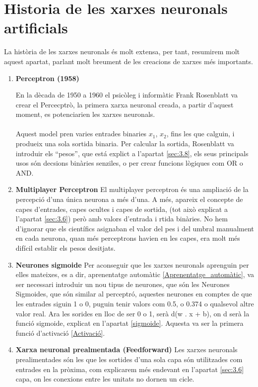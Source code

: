 \section{Historia de les xarxes neuronals artificials}
La història de les xarxes neuronals és molt extensa, per tant, resumirem molt aquest apartat, parlant molt breument de les creacions de xarxes més importants.
\begin{enumerate}
    \item \textbf{Perceptron (1958)}

    En la dècada de 1950 a 1960 el psicòleg i informàtic Frank Rosenblatt va crear el Percecptrò, la primera xarxa neuronal creada, a partir d'aquest moment, es potenciarien les xarxes neuronals.\\ \\
    Aquest model pren varies entrades binaries $x_1$, $x_2$, fins les que calguin, i produeix una sola sortida binaria. Per calcular la sortida, Rosenblatt va introduir els ``pesos'', que está explict a l'apartat \ref{sec:3.8}, els seus principals usos són decsions binàries senziles, o per crear funcions lògiques com OR o AND.

    \item \textbf{Multiplayer Perceptron}
    El multiplayer perceptron és una ampliació de la percepció d'una única neurona a més d'una. A més, apareix el concepte de capes d'entrades, capes ocultes i capes de sortida, (tot això explicat a l'apartat \ref{sec:3.6}) però amb valors d'entrada i rtida binàries. No hem d'ignorar que els científics asignaban el valor del pes i del umbral manualment en cada neurona, quan més perceptrons havien en les capes, era molt més difícil establir els pesos desitjats.

    \item \textbf{Neurones sigmoide}
    Per aconseguir que les xarxes neuronals aprenguin per elles mateixes, es a dir, aprenentatge automàtic \ref{Aprenentatge_automàtic}, va ser necessari introduir un nou tipus de neurones, que són les Neurones Sigmoides, que són similar al perceptró, aquestes neurones en comptes de que les entrades siguin 1 o 0, puguin tenir valors com 0.5, o 0.374 o qualsevol altre valor real. Ara les sorides en lloc de ser 0 o 1, serà d(w . x + b), on d serà la funció sigmoide, explicat en l'apartat \ref{sigmoide}. Aquesta va ser la primera funció d'activació \ref{Activació}.

    \item \textbf{Xarxa neuronal prealmentada (Feedforward)}
    Les xarxes neuronals prealimentades són les que les sortides d'una sola capa són utilitzades com entrades en la pròxima, com explicarem més endevant en l'apartat \ref{sec:3.6} capa, on les conexions entre les unitats no dornen un cicle.
\end{enumerate}


